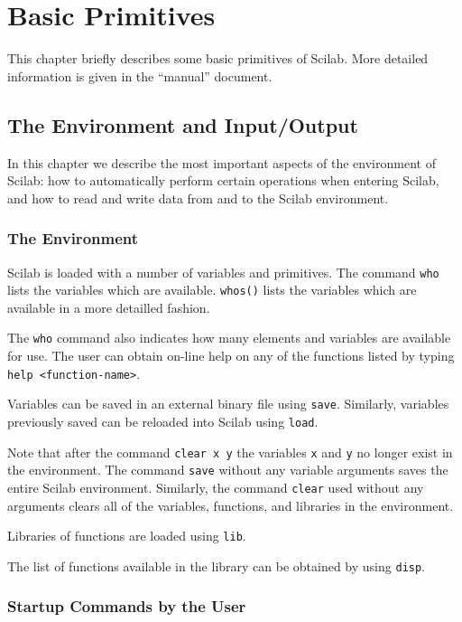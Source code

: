 \chapter{Basic Primitives}
\label{ch5}
This chapter briefly describes some basic primitives of Scilab.
More detailed information is given in the ``manual'' document.

\section{The Environment and Input/Output}
	In this chapter we describe the most important aspects
of the environment of Scilab: how to automatically
perform certain operations when entering Scilab,
and how to read and write data
from and to the Scilab environment.

\subsection{The Environment}
\label{s5.1}

 Scilab is loaded with a number of variables and primitives.
The command {\tt who} lists the variables 
which are available. {\tt whos()} lists the variables 
which are available in a more detailled fashion.  

The {\tt who} command also indicates how many elements and variables
are available for use.  The user can obtain on-line help on any of 
the functions listed by typing {\tt help <function-name>}.

Variables can be saved in an external binary
file using {\tt save}.  
Similarly, variables previously saved can be
reloaded into Scilab using {\tt load}.

Note that after the command {\tt clear x y} 
 the variables {\tt x} and
{\tt y} no longer exist in the environment.  
The command {\tt save} without any variable arguments saves the entire 
Scilab environment.  Similarly,
the command {\tt clear} used
without any arguments clears all of the variables, functions, and libraries
in the environment.

Libraries of functions are loaded
using {\tt lib}.  

The list of functions available in the library can be obtained by using {\tt disp}.

\subsection{Startup Commands by the User}
\label{s5.2}

